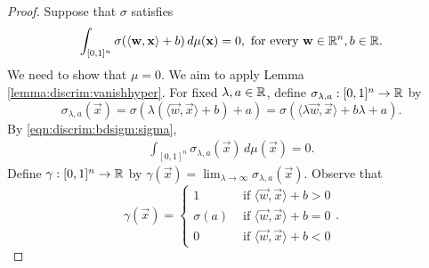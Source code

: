 \begin{proof}
Suppose that $\sigma$ satisfies \begin{align}
    \label{eqn:discrim:bdsigm:sigma}
    \int_{[0,1]^n}\sigma(\langle \mathbf{w}, \mathbf{x} \rangle + b) \, d \mu  (\mathbf{x}) = 0, \text{ for every } \mathbf{w} \in {\mathbb R}^n, b \in {\mathbb R}.
\end{align}
We need to show that $\mu = 0$. We aim to apply Lemma \ref{lemma:discrim:vanishhyper}. For fixed $\lambda, a \in {\mathbb R}$, define $\sigma_{\lambda, a} : [0,1]^n \to {\mathbb R}$ by \[
    \sigma_{\lambda, a} (\vec{x}) = \sigma \left ( \lambda (\langle \vec{w}, \vec{x} \rangle + b) + a \right ) = \sigma \left (\langle \lambda \vec{w}, \vec{x} \rangle + b\lambda + a \right ).
\]
By \ref{eqn:discrim:bdsigm:sigma}, 
 \begin{align}
    \label{eqn:discrim:bdsigm:sigmalambda}
    \int_{[0,1]^n}\sigma_{\lambda, a} (\vec{x}) \, d \mu  (\vec{x}) = 0.
\end{align}
Define $\gamma : [0,1]^n \to {\mathbb R}$ by $\gamma(\vec{x}) = \lim_{\lambda \to \infty} \sigma_{\lambda, a} (\vec{x})$. Observe that  \begin{equation}
    \label{eqn:discrim:bdsigm:gamma}
    \gamma(\vec{x}) =
    \begin{cases}
      1         & \text{ if } \langle \vec{w}, \vec{x} \rangle + b > 0 \\
      \sigma(a) & \text{ if } \langle \vec{w}, \vec{x} \rangle + b = 0 \\
      0         & \text{ if } \langle \vec{w}, \vec{x} \rangle + b < 0
    \end{cases}.
  \end{equation}
  

\end{proof}
